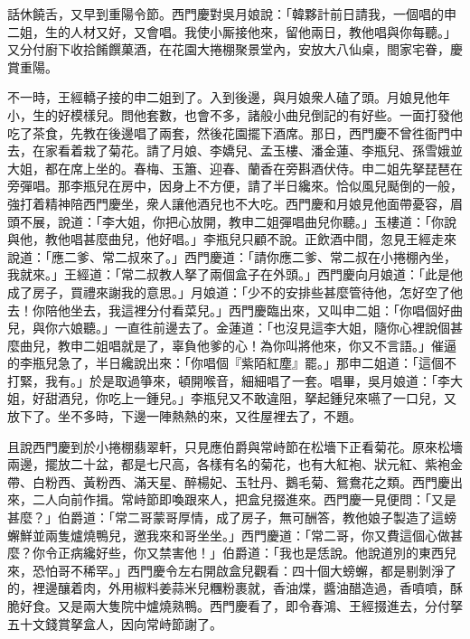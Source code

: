 話休饒舌，又早到重陽令節。西門慶對吳月娘說：「韓夥計前日請我，一個唱的申二姐，生的人材又好，又會唱。我使小厮接他來，留他兩日，教他唱與你每聽。」又分付廚下收拾餚饌菓酒，在花園大捲棚聚景堂內，安放大八仙桌，閤家宅眷，慶賞重陽。

不一時，王經轎子接的申二姐到了。入到後邊，與月娘衆人磕了頭。月娘見他年小，生的好模樣兒。問他套數，也會不多，諸般小曲兒倒記的有好些。一面打發他吃了茶食，先教在後邊唱了兩套，然後花園擺下酒席。那日，西門慶不曾徃衙門中去，在家看着栽了菊花。請了月娘、李嬌兒、孟玉樓、潘金蓮、李瓶兒、孫雪娥並大姐，都在席上坐的。春梅、玉簫、迎春、蘭香在旁斟酒伏侍。申二姐先拏琵琶在旁彈唱。那李瓶兒在房中，因身上不方便，請了半日纔來。恰似風兒颳倒的一般，強打着精神陪西門慶坐，衆人讓他酒兒也不大吃。西門慶和月娘見他面帶憂容，眉頭不展，說道：「李大姐，你把心放開，教申二姐彈唱曲兒你聽。」玉樓道：「你說與他，教他唱甚麼曲兒，他好唱。」李瓶兒只顧不說。正飲酒中間，忽見王經走來說道：「應二爹、常二叔來了。」西門慶道：「請你應二爹、常二叔在小捲棚內坐，我就來。」王經道：「常二叔教人拏了兩個盒子在外頭。」西門慶向月娘道：「此是他成了房子，買禮來謝我的意思。」月娘道：「少不的安排些甚麼管待他，怎好空了他去！你陪他坐去，我這裡分付看菜兒。」{}西門慶臨出來，又叫申二姐：「你唱個好曲兒，與你六娘聽。」一直徃前邊去了。金蓮道：「也沒見這李大姐，隨你心裡說個甚麼曲兒，教申二姐唱就是了，辜負他爹的心！為你叫將他來，你又不言語。」催逼的李瓶兒急了，半日纔說出來：「你唱個『紫陌紅塵』罷。」那申二姐道：「這個不打緊，我有。」於是取過箏來，頓開喉音，細細唱了一套。唱畢，吳月娘道：「李大姐，好甜酒兒，你吃上一鍾兒。」李瓶兒又不敢違阻，拏起鍾兒來嚥了一口兒，又放下了。坐不多時，下邊一陣熱熱的來，又徃屋裡去了，不題。

且說西門慶到於小捲棚翡翠軒，只見應伯爵與常峙節在松墻下正看菊花。原來松墻兩邊，擺放二十盆，都是七尺高，各樣有名的菊花，{}也有大紅袍、狀元紅、紫袍金帶、白粉西、黃粉西、滿天星、醉楊妃、玉牡丹、鵝毛菊、鴛鴦花之類。西門慶出來，二人向前作揖。常峙節即喚跟來人，把盒兒掇進來。西門慶一見便問：「又是甚麼？」伯爵道：「常二哥蒙哥厚情，成了房子，無可酬答，教他娘子製造了這螃蠏鮮並兩隻爐燒鴨兒，邀我來和哥坐坐。」西門慶道：「常二哥，你又費這個心做甚麼？你令正病纔好些，你又禁害他！」伯爵道：「我也是恁說。他說道別的東西兒來，恐怕哥不稀罕。」西門慶令左右開啟盒兒觀看：四十個大螃蠏，都是剔剝淨了的，裡邊釀着肉，外用椒料姜蒜米兒糰粉裹就，香油煠，醬油醋造過，香噴噴，酥脆好食。又是兩大隻院中爐燒熟鴨。西門慶看了，即令春鴻、王經掇進去，分付拏五十文錢賞拏盒人，因向常峙節謝了。

